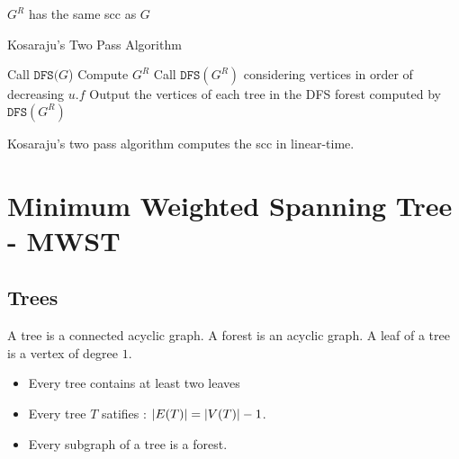 \documentclass{cours}
\begin{document}
        \begin{proposition}
            $G^{R}$ has the same scc as $G$
        \end{proposition}

        \begin{algorithm}
            \caption{Kosaraju's Two Pass Algorithm}
            \begin{algorithmic}
                \State Call $\texttt{DFS}(G$) 
                \State Compute $G^{R}$
                \State Call $\texttt{DFS}(G^{R})$ considering vertices in order of decreasing $u.f$
                \Return Output the vertices of each tree in the DFS forest computed by $\texttt{DFS}(G^{R})$
            \end{algorithmic}
        \end{algorithm}

        \begin{theorem}
            Kosaraju's two pass algorithm computes the scc in linear-time.   
        \end{theorem}
        

        \section{Minimum Weighted Spanning Tree - MWST}
        \subsection{Trees}
        \begin{definition}
            A tree is a connected acyclic graph. A forest is an acyclic graph. A leaf of a tree is a vertex of degree $1$.
        \end{definition}

        \begin{proposition}
            \begin{itemize}
                \item Every tree contains at least two leaves
                \item Every tree $T$ satifies : $\left|E(T)\right| = \left|V(T)\right| - 1$.
                \item Every subgraph of a tree is a forest.
            \end{itemize}
        \end{proposition}
\end{document}
